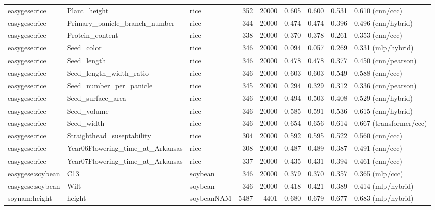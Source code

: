 \begin{longtable}{@{}p{2.25cm}p{1.35cm}p{1.85cm}rrcccp{2.7cm}@{}}
easygese:rice & Plant\_\allowbreak{}height & rice & 352 & 20000 & 0.605 & 0.600 & 0.531 & 0.610 (cnn/ccc) \\
easygese:rice & Primary\_\allowbreak{}panicle\_\allowbreak{}branch\_\allowbreak{}number & rice & 344 & 20000 & 0.474 & 0.474 & 0.396 & 0.496 (cnn/hybrid) \\
easygese:rice & Protein\_\allowbreak{}content & rice & 338 & 20000 & 0.370 & 0.378 & 0.261 & 0.353 (cnn/ccc) \\
easygese:rice & Seed\_\allowbreak{}color & rice & 346 & 20000 & 0.094 & 0.057 & 0.269 & 0.331 (mlp/hybrid) \\
easygese:rice & Seed\_\allowbreak{}length & rice & 346 & 20000 & 0.478 & 0.478 & 0.377 & 0.450 (cnn/pearson) \\
easygese:rice & Seed\_\allowbreak{}length\_\allowbreak{}width\_\allowbreak{}ratio & rice & 346 & 20000 & 0.603 & 0.603 & 0.549 & 0.588 (cnn/ccc) \\
easygese:rice & Seed\_\allowbreak{}number\_\allowbreak{}per\_\allowbreak{}panicle & rice & 345 & 20000 & 0.294 & 0.329 & 0.312 & 0.336 (cnn/pearson) \\
easygese:rice & Seed\_\allowbreak{}surface\_\allowbreak{}area & rice & 346 & 20000 & 0.494 & 0.503 & 0.408 & 0.529 (cnn/hybrid) \\
easygese:rice & Seed\_\allowbreak{}volume & rice & 346 & 20000 & 0.585 & 0.591 & 0.536 & 0.615 (cnn/hybrid) \\
easygese:rice & Seed\_\allowbreak{}width & rice & 346 & 20000 & 0.654 & 0.656 & 0.614 & 0.667 (transformer/ccc) \\
easygese:rice & Straighthead\_\allowbreak{}suseptability & rice & 304 & 20000 & 0.592 & 0.595 & 0.522 & 0.560 (cnn/ccc) \\
easygese:rice & Year06Flowering\_\allowbreak{}time\_\allowbreak{}at\_\allowbreak{}Arkansas & rice & 308 & 20000 & 0.487 & 0.489 & 0.387 & 0.491 (cnn/ccc) \\
easygese:rice & Year07Flowering\_\allowbreak{}time\_\allowbreak{}at\_\allowbreak{}Arkansas & rice & 337 & 20000 & 0.435 & 0.431 & 0.394 & 0.461 (cnn/ccc) \\
easygese:soybean & C13 & soybean & 346 & 20000 & 0.379 & 0.370 & 0.357 & 0.365 (mlp/ccc) \\
easygese:soybean & Wilt & soybean & 346 & 20000 & 0.418 & 0.421 & 0.389 & 0.414 (mlp/hybrid) \\
soynam:height & height & soybeanNAM & 5487 & 4401 & 0.680 & 0.679 & 0.677 & 0.683 (mlp/hybrid) \\

\end{longtable}
